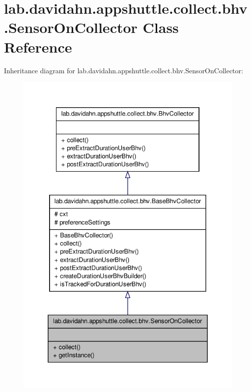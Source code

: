 \hypertarget{classlab_1_1davidahn_1_1appshuttle_1_1collect_1_1bhv_1_1_sensor_on_collector}{\section{lab.\-davidahn.\-appshuttle.\-collect.\-bhv.\-Sensor\-On\-Collector \-Class \-Reference}
\label{classlab_1_1davidahn_1_1appshuttle_1_1collect_1_1bhv_1_1_sensor_on_collector}
}


\-Inheritance diagram for lab.\-davidahn.\-appshuttle.\-collect.\-bhv.\-Sensor\-On\-Collector\-:
\nopagebreak
\begin{figure}[H]
\begin{center}
\leavevmode
\includegraphics[width=334pt]{classlab_1_1davidahn_1_1appshuttle_1_1collect_1_1bhv_1_1_sensor_on_collector__inherit__graph}
\end{center}
\end{figure}


